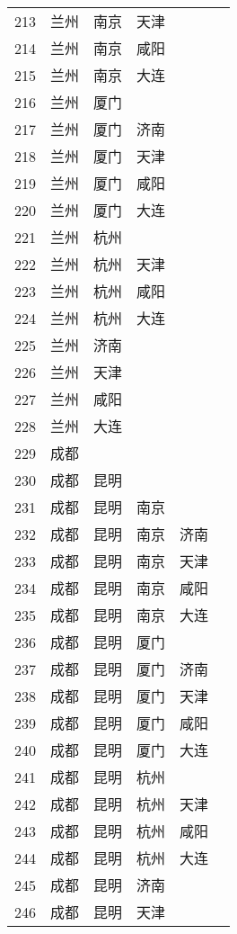 \begin{footnotesize}
\begin{longtable}{cccccc}
        213	& 兰州  & 南京  & 天津 \\
        214	& 兰州  & 南京  & 咸阳 \\
        215	& 兰州  & 南京  & 大连 \\
        216	& 兰州  & 厦门 \\
        217	& 兰州  & 厦门  & 济南 \\
        218	& 兰州  & 厦门  & 天津 \\
        219	& 兰州  & 厦门  & 咸阳 \\
        220	& 兰州  & 厦门  & 大连 \\
        221	& 兰州  & 杭州 \\
        222	& 兰州  & 杭州  & 天津 \\
        223	& 兰州  & 杭州  & 咸阳 \\
        224	& 兰州  & 杭州  & 大连 \\
        225	& 兰州  & 济南 \\
        226	& 兰州  & 天津 \\
        227	& 兰州  & 咸阳 \\
        228	& 兰州  & 大连 \\
        229	& 成都 \\
        230	& 成都  & 昆明 \\
        231	& 成都  & 昆明  & 南京 \\
        232	& 成都  & 昆明  & 南京  & 济南 \\
        233	& 成都  & 昆明  & 南京  & 天津 \\
        234	& 成都  & 昆明  & 南京  & 咸阳 \\
        235	& 成都  & 昆明  & 南京  & 大连 \\
        236	& 成都  & 昆明  & 厦门 \\
        237	& 成都  & 昆明  & 厦门  & 济南 \\
        238	& 成都  & 昆明  & 厦门  & 天津 \\
        239	& 成都  & 昆明  & 厦门  & 咸阳 \\
        240	& 成都  & 昆明  & 厦门  & 大连 \\
        241	& 成都  & 昆明  & 杭州 \\
        242	& 成都  & 昆明  & 杭州  & 天津 \\
        243	& 成都  & 昆明  & 杭州  & 咸阳 \\
        244	& 成都  & 昆明  & 杭州  & 大连 \\
        245	& 成都  & 昆明  & 济南 \\
        246	& 成都  & 昆明  & 天津 \\

\end{longtable}
\end{footnotesize}
